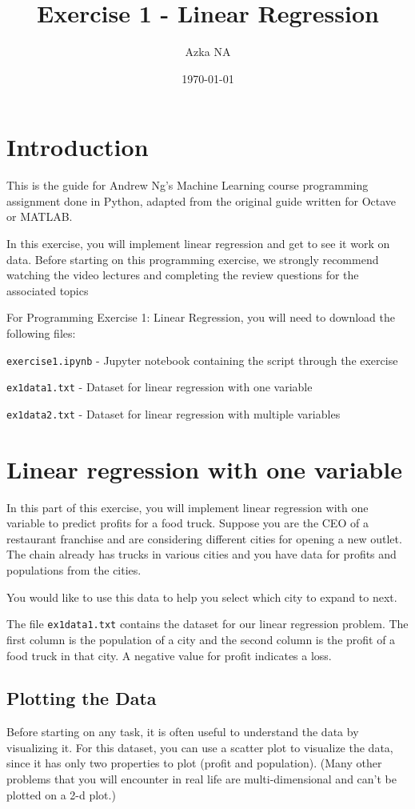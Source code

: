 \documentclass{article}
\title{Exercise 1 - Linear Regression}
\author{Azka NA}
\date{\today}
\begin{document}
\maketitle

\section{Introduction}
This is the guide for Andrew Ng's Machine Learning course programming assignment done in Python, adapted from the original guide written for Octave or MATLAB.

In this exercise, you will implement linear regression and get to see it work on data. Before starting on this programming exercise, we strongly recommend watching the video lectures and completing the review questions for the associated topics

For Programming Exercise 1: Linear Regression, you will need to download the following files:

\texttt{exercise1.ipynb} - Jupyter notebook containing the script through the exercise

\texttt{ex1data1.txt} - Dataset for linear regression with one variable

\texttt{ex1data2.txt} - Dataset for linear regression with multiple variables

\section{Linear regression with one variable}

In this part of this exercise, you will implement linear regression with one variable to predict profits for a food truck. Suppose you are the CEO of a restaurant franchise and are considering different cities for opening a new outlet. The chain already has trucks in various cities and you have data for profits and populations from the cities.

You would like to use this data to help you select which city to expand to next.

The file \texttt{ex1data1.txt} contains the dataset for our linear regression problem. The first column is the population of a city and the second column is the profit of a food truck in that city. A negative value for profit indicates a loss.

\subsection{Plotting the Data}
Before starting on any task, it is often useful to understand the data by visualizing it. For this dataset, you can use a scatter plot to visualize the data, since it has only two properties to plot (profit and population). (Many other problems that you will encounter in real life are multi-dimensional and can’t be plotted on a 2-d plot.)
\end{document}
